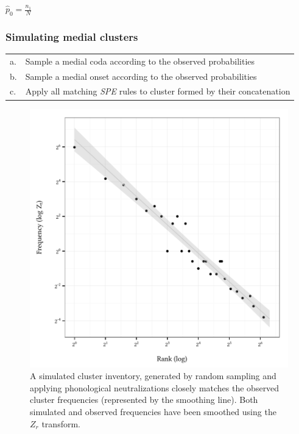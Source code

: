 \begin{unlabeledexample}
$\displaystyle \hat{p}_0 = \frac{n_1}{N}$
\end{unlabeledexample}


\subsubsection{Simulating medial clusters}

\begin{example}
\begin{tabular}{l l}
a. & Sample a medial coda according to the observed probabilities  \\
b. & Sample a medial onset according to the observed probabilities \\
c. & Apply all matching \emph{SPE} rules to cluster formed by their concatenation \\
\end{tabular}
\end{example}

\begin{figure}
\centering
\includegraphics{sim.pdf}
\caption{A simulated cluster inventory, generated by random sampling and applying phonological neutralizations closely matches the observed cluster frequencies (represented by the smoothing line). Both simulated and observed frequencies have been smoothed using the $Z_r$ transform.}
\label{sim}
\end{figure}

